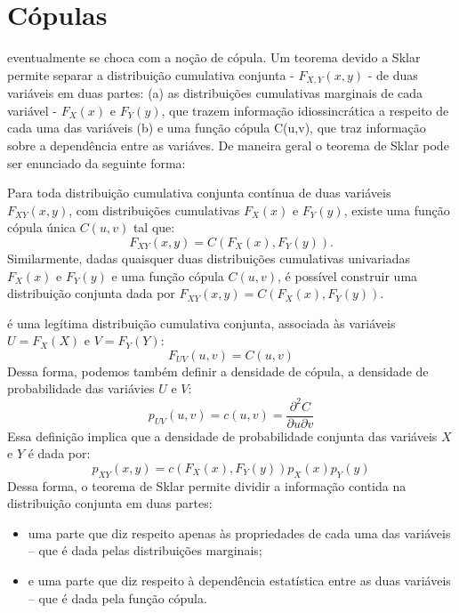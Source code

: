 \section{Cópulas}
 eventualmente se choca com a noção de cópula\cite{Nelsen2006}. Um teorema devido a Sklar\cite{Sklar1959} permite separar a distribuição cumulativa conjunta - $F_{X,Y}(x,y)$ - de duas variáveis em duas partes: (a) as distribuições cumulativas marginais de cada variável - $F_{X}(x)$ e $F_{Y}(y)$, que trazem informação idiossincrática a respeito de cada uma das variáveis (b) e uma função cópula C(u,v), que traz informação sobre a dependência entre as variáves. De maneira geral o teorema de Sklar pode ser enunciado da seguinte forma:
\begin{Teorema}
Para toda distribuição cumulativa conjunta contínua de duas variáveis $F_{XY}(x,y)$, com distribuições cumulativas $F_X(x)$ e $F_Y(y)$, existe uma função cópula única $C(u,v)$ tal que:
\begin{equation}
 F_{XY}(x,y) = C(F_{X}(x), F_{Y}(y)).
\end{equation}
Similarmente, dadas quaisquer duas distribuições cumulativas univariadas $F_X(x)$ e $F_Y(y)$ e uma função cópula $C(u,v)$, é possível construir uma distribuição conjunta dada por $F_{XY}(x,y) = C(F_X(x),F_Y(y))$.
\end{Teorema}

 é uma legítima distribuição cumulativa conjunta, associada às variáveis $U = F_{X}(X)$ e $V = F_{Y}(Y)$:
\begin{equation*}
 F_{UV}(u,v) = C(u,v)
\end{equation*}
Dessa forma, podemos também definir a densidade de cópula, a densidade de probabilidade das variávies $U$ e $V$:
\begin{equation*}
 p_{UV}(u,v) = c(u,v) = \frac{\partial^2 C}{\partial u \partial v}
\end{equation*}
Essa definição implica que a densidade de probabilidade conjunta das variáveis $X$ e $Y$ é dada por:
\begin{equation}
\label{eq:density}
 p_{XY}(x,y) = c(F_X(x), F_Y(y)) p_X(x) p_Y(y)
\end{equation}
Dessa forma, o teorema de Sklar permite dividir a informação contida na distribuição conjunta em duas partes: 
\begin{itemize}
 \item uma parte que diz respeito apenas às propriedades de cada uma das variáveis -- que é dada pelas distribuições marginais;
 \item e uma parte que diz respeito à dependência estatística entre as duas variáveis -- que é dada pela função cópula. 
\end{itemize}
 
